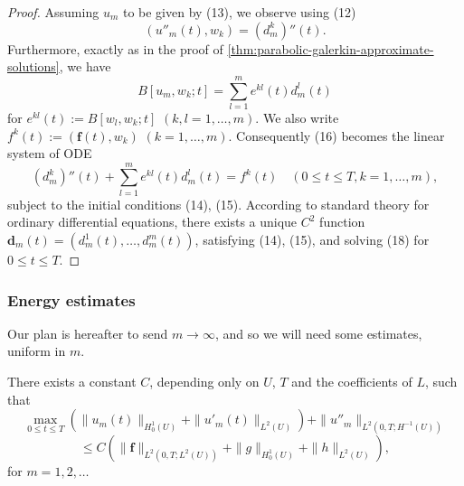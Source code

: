 \begin{proof}
Assuming $u_m$ to be given by (13), we observe using (12)
\[
(u''_m(t), w_k) = (d_m^k)''(t).
\tag{17}
\]
Furthermore, exactly as in the proof of \cref{thm:parabolic-galerkin-approximate-solutions}, we have
\[
B[u_m, w_k; t] = \sum_{l=1}^{m} e^{kl}(t)d_m^l(t)
\]
for $e^{kl}(t) := B[w_l, w_k; t]$ $(k, l = 1, \ldots, m)$. We also write $f^k(t) := (\mathbf{f}(t), w_k)$ $(k = 1, \ldots, m)$. Consequently (16) becomes the linear system of ODE
\[
(d_m^k)''(t) + \sum_{l=1}^{m} e^{kl}(t)d_m^l(t) = f^k(t) \quad (0 \le t \le T, k = 1, \ldots, m),
\tag{18}
\]
subject to the initial conditions (14), (15). According to standard theory for ordinary differential equations, there exists a unique $C^2$ function $\mathbf{d}_m(t) = (d_m^1(t), \ldots, d_m^m(t))$, satisfying (14), (15), and solving (18) for $0 \le t \le T$.
\end{proof}

\subsubsection{Energy estimates}

Our plan is hereafter to send $m \to \infty$, and so we will need some estimates, uniform in $m$.

\begin{theorem}
\label{thm:hyperbolic-energy-estimates}
There exists a constant $C$, depending only on $U$, $T$ and the coefficients of $L$, such that
\[
\max_{0 \le t \le T} \left( \|u_m(t)\|_{H^1_0(U)} + \|u'_m(t)\|_{L^2(U)} \right) + \|u''_m\|_{L^2(0,T;H^{-1}(U))}
\]
\[
\le C \left( \|\mathbf{f}\|_{L^2(0,T;L^2(U))} + \|g\|_{H^1_0(U)} + \|h\|_{L^2(U)} \right),
\tag{19}
\]
for $m = 1, 2, \ldots$
\end{theorem}

